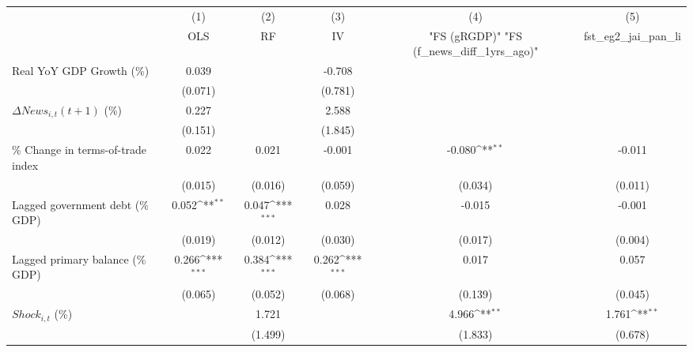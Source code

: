 {
\def\sym#1{\ifmmode^{#1}\else\(^{#1}\)\fi}
\begin{tabular}{l*{5}{c}}
\toprule
                    &\multicolumn{1}{c}{(1)}&\multicolumn{1}{c}{(2)}&\multicolumn{1}{c}{(3)}&\multicolumn{1}{c}{(4)}&\multicolumn{1}{c}{(5)}\\
                    &\multicolumn{1}{c}{OLS}&\multicolumn{1}{c}{RF}&\multicolumn{1}{c}{IV}&\multicolumn{1}{c}{ "FS (gRGDP)"  "FS (f_news_diff_1yrs_ago)" }&\multicolumn{1}{c}{fst_eg2_jai_pan_li}\\
\midrule
Real YoY GDP Growth (\%)&       0.039         &                     &      -0.708         &                     &                     \\
                    &     (0.071)         &                     &     (0.781)         &                     &                     \\
\addlinespace
$ \Delta News_{i,t}(t+1)$ (\%)&       0.227         &                     &       2.588         &                     &                     \\
                    &     (0.151)         &                     &     (1.845)         &                     &                     \\
\addlinespace
\% Change in terms-of-trade index&       0.022         &       0.021         &      -0.001         &      -0.080\sym{**} &      -0.011         \\
                    &     (0.015)         &     (0.016)         &     (0.059)         &     (0.034)         &     (0.011)         \\
\addlinespace
Lagged government debt (\% GDP)&       0.052\sym{**} &       0.047\sym{***}&       0.028         &      -0.015         &      -0.001         \\
                    &     (0.019)         &     (0.012)         &     (0.030)         &     (0.017)         &     (0.004)         \\
\addlinespace
Lagged primary balance (\% GDP)&       0.266\sym{***}&       0.384\sym{***}&       0.262\sym{***}&       0.017         &       0.057         \\
                    &     (0.065)         &     (0.052)         &     (0.068)         &     (0.139)         &     (0.045)         \\
\addlinespace
$ Shock_{i,t}$ (\%) &                     &       1.721         &                     &       4.966\sym{**} &       1.761\sym{**} \\
                    &                     &     (1.499)         &                     &     (1.833)         &     (0.678)         \\

\end{tabular}}
